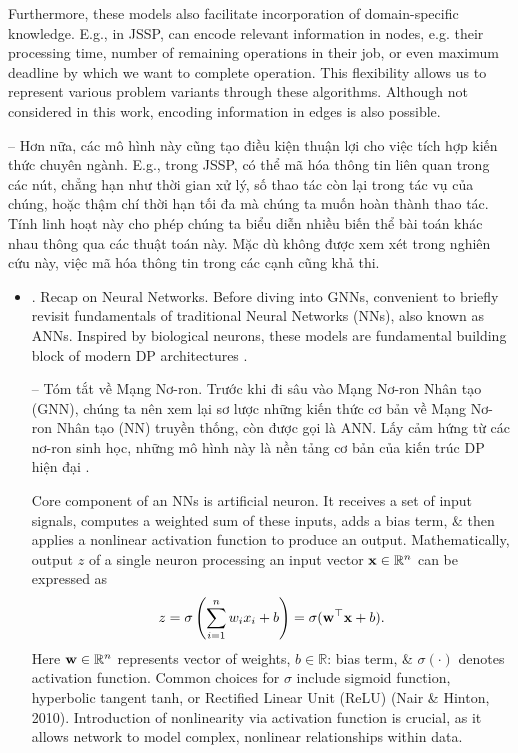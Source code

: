 \documentclass{article}
\begin{document}
\begin{itemize}
    Furthermore, these models also facilitate incorporation of domain-specific knowledge. E.g., in JSSP, can encode relevant information in nodes, e.g. their processing time, number of remaining operations in their job, or even maximum deadline by which we want to complete operation. This flexibility allows us to represent various problem variants through these algorithms. Although not considered in this work, encoding information in edges is also possible.

    -- Hơn nữa, các mô hình này cũng tạo điều kiện thuận lợi cho việc tích hợp kiến thức chuyên ngành. E.g., trong JSSP, có thể mã hóa thông tin liên quan trong các nút, chẳng hạn như thời gian xử lý, số thao tác còn lại trong tác vụ của chúng, hoặc thậm chí thời hạn tối đa mà chúng ta muốn hoàn thành thao tác. Tính linh hoạt này cho phép chúng ta biểu diễn nhiều biến thể bài toán khác nhau thông qua các thuật toán này. Mặc dù không được xem xét trong nghiên cứu này, việc mã hóa thông tin trong các cạnh cũng khả thi.
    \begin{itemize}
        \item {. Recap on Neural Networks.} Before diving into GNNs, convenient to briefly revisit fundamentals of traditional Neural Networks (NNs), also known as ANNs. Inspired by biological neurons, these models are fundamental building block of modern DP architectures \cite{LeCun_Bengio_Hinton2015}.

        -- {\sf Tóm tắt về Mạng Nơ-ron.} Trước khi đi sâu vào Mạng Nơ-ron Nhân tạo (GNN), chúng ta nên xem lại sơ lược những kiến thức cơ bản về Mạng Nơ-ron Nhân tạo (NN) truyền thống, còn được gọi là ANN. Lấy cảm hứng từ các nơ-ron sinh học, những mô hình này là nền tảng cơ bản của kiến trúc DP hiện đại \cite{LeCun_Bengio_Hinton2015}.

        Core component of an NNs is artificial neuron. It receives a set of input signals, computes a weighted sum of these inputs, adds a bias term, \& then applies a nonlinear activation function to produce an output. Mathematically, output $z$ of a single neuron processing an input vector ${\bf x}\in\mathbb{R}^n$ can be expressed as
        \begin{equation*}
            z = \sigma\left(\sum_{i=1}^n w_ix_i + b\right) = \sigma({\bf w}^\top{\bf x} + b).
        \end{equation*}
        Here ${\bf w}\in\mathbb{R}^n$ represents vector of weights, $b\in\mathbb{R}$: bias term, \& $\sigma(\cdot)$ denotes activation function. Common choices for $\sigma$ include sigmoid function, hyperbolic tangent tanh, or Rectified Linear Unit (ReLU) (Nair \& Hinton, 2010). Introduction of nonlinearity via activation function is crucial, as it allows network to model complex, nonlinear relationships within data.


\end{itemize}
\end{itemize}
\end{document}
